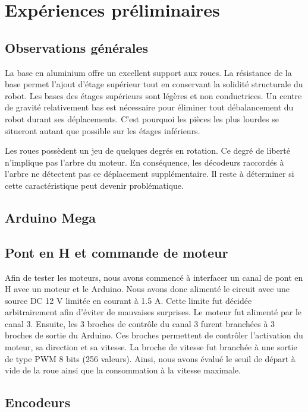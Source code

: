 
\chapter{Expériences préliminaires}

\section{Observations générales}
  La base en aluminium offre un excellent support aux roues. La résistance de la base permet l’ajout d’étage supérieur tout en conservant la solidité structurale du robot. Les bases des étages supérieurs sont légères et non conductrices. Un centre de gravité relativement bas est nécessaire pour éliminer tout débalancement du robot durant ses déplacements. C’est pourquoi les pièces les plus lourdes se situeront autant que possible sur les étages inférieurs.

Les roues possèdent un jeu de quelques degrés en rotation. Ce degré de liberté n’implique pas l’arbre du moteur. En conséquence, les décodeurs raccordés à l’arbre ne détectent pas ce déplacement supplémentaire. Il reste à déterminer si cette caractéristique peut devenir problématique. 

\section{Arduino Mega}

\section{Pont en H et commande de moteur}

Afin de tester les moteurs, nous avons commencé à interfacer un canal de pont en H avec un moteur et le Arduino. Nous avons donc alimenté le circuit avec une source DC 12 V limitée en courant à 1.5 A. Cette limite fut décidée arbitrairement afin d'éviter de mauvaises surprises. Le moteur fut alimenté par le canal 3. Ensuite, les 3 broches de contrôle du canal 3 furent branchées à 3 broches de sortie du Arduino. Ces broches permettent de contrôler l'activation du moteur, sa direction et sa vitesse.  La broche de vitesse fut branchée à une sortie de type PWM 8 bits (256 valeurs). Ainsi, nous avons évalué le seuil de départ à vide de la roue ainsi que la consommation à la vitesse maximale. 

\section{Encodeurs}

